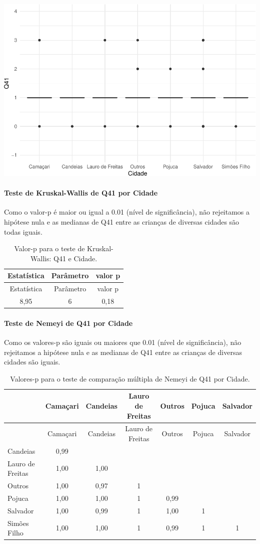 \documentclass[]{article}
\let\oldparagraph\paragraph
\renewcommand{\paragraph}[1]{\oldparagraph{#1}\mbox{}}
\begin{document}
\begin{center}\includegraphics[width=0.75\linewidth]{relatorio_covid19_files/figure-latex/unnamed-chunk-1611-1} \end{center}

\hypertarget{teste-de-kruskal-wallis-de-q41-por-cidade}{%
\paragraph{Teste de Kruskal-Wallis de Q41 por Cidade}\label{teste-de-kruskal-wallis-de-q41-por-cidade}}

Como o valor-p é maior ou igual a 0.01 (nível de significância), não rejeitamos a hipótese nula e as medianas de Q41 entre as crianças de diversas cidades são todas iguais.

\begin{longtable}[]{@{}ccc@{}}
\caption{\label{tab:unnamed-chunk-1613}Valor-p para o teste de Kruskal-Wallis: Q41 e Cidade.}\tabularnewline
\toprule
Estatística & Parâmetro & valor p\tabularnewline
\midrule
\endfirsthead
\toprule
Estatística & Parâmetro & valor p\tabularnewline
\midrule
\endhead
8,95 & 6 & 0,18\tabularnewline
\bottomrule
\end{longtable}

\hypertarget{teste-de-nemeyi-de-q41-por-cidade}{%
\paragraph{Teste de Nemeyi de Q41 por Cidade}\label{teste-de-nemeyi-de-q41-por-cidade}}

Como os valores-p são iguais ou maiores que 0.01 (nível de significância), não rejeitamos a hipótese nula e as medianas de Q41 entre as crianças de diversas cidades são iguais.

\begin{longtable}[]{@{}lcccccc@{}}
\caption{\label{tab:unnamed-chunk-1615}Valores-p para o teste de comparação múltipla de Nemeyi de Q41 por Cidade.}\tabularnewline
\toprule
& Camaçari & Candeias & Lauro de Freitas & Outros & Pojuca & Salvador\tabularnewline
\midrule
\endfirsthead
\toprule
& Camaçari & Candeias & Lauro de Freitas & Outros & Pojuca & Salvador\tabularnewline
\midrule
\endhead
Candeias & 0,99 & & & & &\tabularnewline
Lauro de Freitas & 1,00 & 1,00 & & & &\tabularnewline
Outros & 1,00 & 0,97 & 1 & & &\tabularnewline
Pojuca & 1,00 & 1,00 & 1 & 0,99 & &\tabularnewline
Salvador & 1,00 & 0,99 & 1 & 1,00 & 1 &\tabularnewline
Simões Filho & 1,00 & 1,00 & 1 & 0,99 & 1 & 1\tabularnewline
\bottomrule
\end{longtable}
\end{document}
